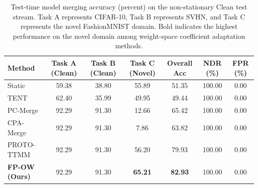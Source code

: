 \documentclass{article}
\theoremstyle{plain}
\theoremstyle{definition}
\theoremstyle{remark}
\begin{document}
\begin{table}[t]
  \caption{Test-time model merging accuracy (percent) on the non-stationary Clean test stream. Task A represents CIFAR-10, Task B represents SVHN, and Task C represents the novel FashionMNIST domain. Bold indicates the highest performance on the novel domain among weight-space coefficient adaptation methods.}
  \label{tab:clean-results}
  \vskip 0.15in
  \begin{center}
  \begin{small}
  \begin{sc}
  \setlength{\tabcolsep}{5pt}
  \begin{tabular}{lcccccc}
    \toprule
    Method & Task A (Clean) & Task B (Clean) & Task C (Novel) & Overall Acc & NDR (\%) & FPR (\%) \\
    \midrule
    Static & 59.38 & 38.80 & 55.89 & 51.35 & 100.00 & 0.00 \\
    TENT & 62.40 & 35.99 & 49.95 & 49.44 & 100.00 & 0.00 \\
    PC-Merge & 92.29 & 91.30 & 12.66 & 65.42 & 100.00 & 0.00 \\
    CPA-Merge & 92.29 & 91.30 & 7.86 & 63.82 & 100.00 & 0.00 \\
    PROTO-TTMM & 92.29 & 91.30 & 56.20 & 79.93 & 100.00 & 0.00 \\
    \midrule
    \textbf{FP-OW (Ours)} & 92.29 & 91.30 & \textbf{65.21} & \textbf{82.93} & 100.00 & 0.00 \\
    \bottomrule
  \end{tabular}
  \end{sc}
  \end{small}
  \end{center}
  \vskip -0.1in
\end{table}
\end{document}
